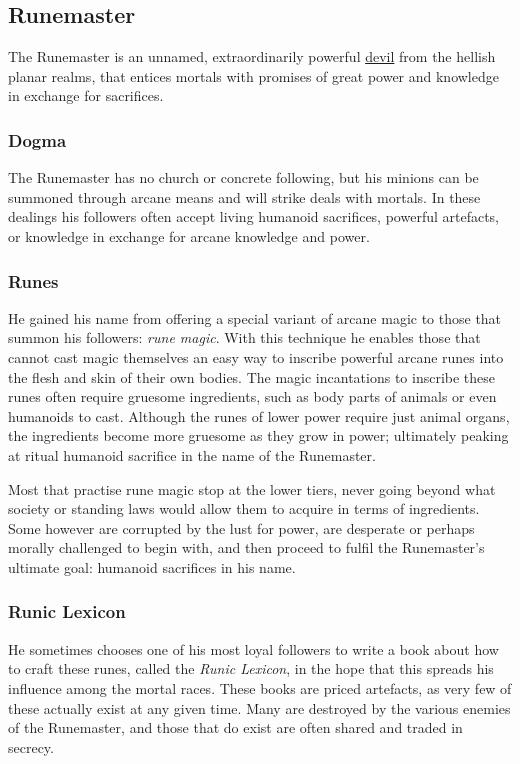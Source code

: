 \subsection{Runemaster}
\label{sec:Runemaster}

The Runemaster is an unnamed, extraordinarily powerful
\hyperref[sec:Devils]{devil} from the hellish planar realms, that entices
mortals with promises of great power and knowledge in exchange for sacrifices.

\subsubsection{Dogma}

The Runemaster has no church or concrete following, but his minions can
be summoned through arcane means and will strike deals with mortals. In these
dealings his followers often accept living humanoid sacrifices, powerful
artefacts, or knowledge in exchange for arcane knowledge and power.

\subsubsection{Runes}

He gained his name from offering a special variant of arcane magic to those
that summon his followers: \emph{rune magic}. With this technique he enables
those that cannot cast magic themselves an easy way to inscribe powerful
arcane runes into the flesh and skin of their own bodies. The magic
incantations to inscribe these runes often require gruesome ingredients, such
as body parts of animals or even humanoids to cast. Although the runes of
lower power require just animal organs, the ingredients become more gruesome as
they grow in power; ultimately peaking at ritual humanoid sacrifice in the
name of the Runemaster.

Most that practise rune magic stop at the lower tiers, never going beyond what
society or standing laws would allow them to acquire in terms of
ingredients. Some however are corrupted by the lust for power, are desperate
or perhaps morally challenged to begin with, and then proceed to fulfil the
Runemaster's ultimate goal: humanoid sacrifices in his name.

\subsubsection{Runic Lexicon}

He sometimes chooses one of his most loyal followers to write a book about how
to craft these runes, called the \emph{Runic Lexicon}, in the hope that this
spreads his influence among the mortal races. These books are priced
artefacts, as very few of these actually exist at any given time. Many are
destroyed by the various enemies of the Runemaster, and those that do
exist are often shared and traded in secrecy.

